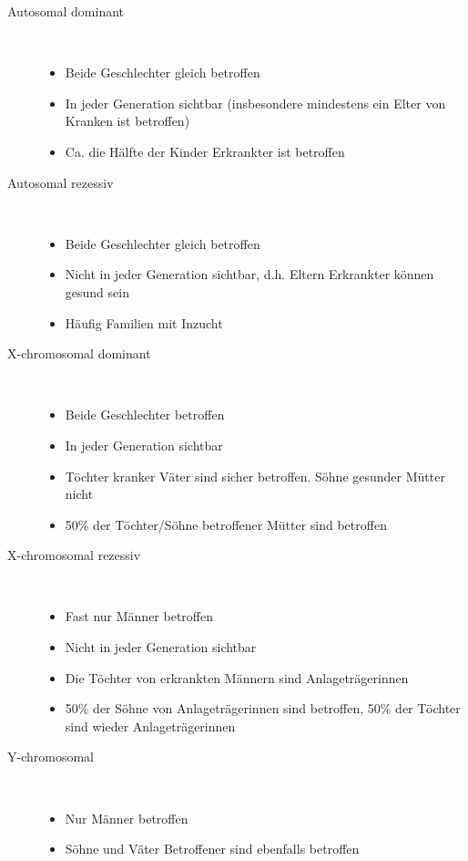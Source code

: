 \begin{description}
    \item[Autosomal dominant] ~
        \begin{itemize}
            \item Beide Geschlechter gleich betroffen
            \item In jeder Generation sichtbar (insbesondere mindestens ein Elter von Kranken ist betroffen)
            \item Ca. die Hälfte der Kinder Erkrankter ist betroffen
        \end{itemize}
\end{description}
\begin{description}
    \item[Autosomal rezessiv] ~
        \begin{itemize}
            \item Beide Geschlechter gleich betroffen
            \item Nicht in jeder Generation sichtbar, d.h. Eltern Erkrankter können gesund sein
            \item Häufig Familien mit Inzucht
        \end{itemize}
\end{description}
\begin{description}
    \item[X-chromosomal dominant] ~
        \begin{itemize}
            \item Beide Geschlechter betroffen
            \item In jeder Generation sichtbar
            \item Töchter kranker Väter sind sicher betroffen. Söhne gesunder Mütter nicht
            \item 50\% der Töchter/Söhne betroffener Mütter sind betroffen
        \end{itemize}
\end{description}
\begin{description}
    \item[X-chromosomal rezessiv] ~
        \begin{itemize}
            \item Fast nur Männer betroffen
            \item Nicht in jeder Generation sichtbar
            \item Die Töchter von erkrankten Männern sind Anlageträgerinnen
            \item 50\% der Söhne von Anlageträgerinnen sind betroffen, 50\% der Töchter sind wieder Anlageträgerinnen
        \end{itemize}
\end{description}
\begin{description}
    \item[Y-chromosomal] ~
        \begin{itemize}
            \item Nur Männer betroffen
            \item Söhne und Väter Betroffener sind ebenfalls betroffen
        \end{itemize}
\end{description}

